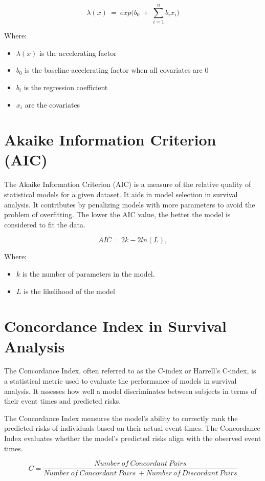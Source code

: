 \documentclass[doublespacing]{report} %
\begin{document}
\[\lambda(x)\ =\ exp(b_0\ +\ \sum_{i=1}^{n}{b_ix_i)}\]

Where:
 \begin{itemize}
     \item \(\lambda(x)\) is the accelerating factor
     \item \(b_0 \) is the baseline accelerating factor when all covariates are 0
     \item \(b_i\) is the regression coefficient
     \item \(x_i\) are the covariates

 \end{itemize}
 
\section{Akaike Information Criterion (AIC)}

The Akaike Information Criterion (AIC) is a measure of the relative quality of statistical models for a given dataset. It aids in model selection in survival analysis. It contributes by penalizing models with more parameters to avoid the problem of overfitting. The lower the AIC value, the better the model is considered to fit the data.

\[AIC=2k-2ln(L),\]

Where:
 \begin{itemize}
     \item \(k \) is the number of parameters in the model.
     \item \(L\) is the likelihood of the model
 \end{itemize}

\section{Concordance Index in Survival Analysis}

The Concordance Index, often referred to as the C-index or Harrell's C-index, is a statistical metric used to evaluate the performance of models in survival analysis. It assesses how well a model discriminates between subjects in terms of their event times and predicted risks. 

The Concordance Index measures the model's ability to correctly rank the predicted risks of individuals based on their actual event times. The Concordance Index evaluates whether the model's predicted risks align with the observed event times.

\[C=\frac{Number\ of\ Concordant\ Pairs}{Number\ of\ Concordant\ Pairs\ +Number\ of\ Discordant\ Pairs}\]
\end{document}
